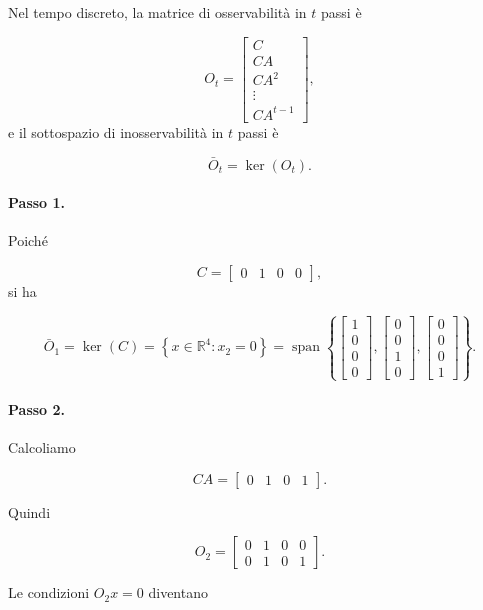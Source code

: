 Nel tempo discreto, la matrice di osservabilità in \(t\) passi è

\[
O_t=
\begin{bmatrix}
C\\
CA\\
CA^2\\
\vdots\\
CA^{t-1}
\end{bmatrix},
\]
e il sottospazio di inosservabilità in \(t\) passi è

\[
\bar O_t = \ker(O_t).
\]

\paragraph{Passo 1.}
Poiché

\[
C=
\begin{bmatrix}
0 & 1 & 0 & 0
\end{bmatrix},
\]
si ha

\[
\bar O_1
=
\ker(C)
=
\left\{
x\in\mathbb R^4 : x_2=0
\right\}
=
\operatorname{span}\left\{
\begin{bmatrix}
1\\0\\0\\0
\end{bmatrix},
\begin{bmatrix}
0\\0\\1\\0
\end{bmatrix},
\begin{bmatrix}
0\\0\\0\\1
\end{bmatrix}
\right\}.
\]

\paragraph{Passo 2.}
Calcoliamo

\[
CA=
\begin{bmatrix}
0 & 1 & 0 & 1
\end{bmatrix}.
\]

Quindi

\[
O_2=
\begin{bmatrix}
0 & 1 & 0 & 0\\
0 & 1 & 0 & 1
\end{bmatrix}.
\]

Le condizioni \(O_2x=0\) diventano

